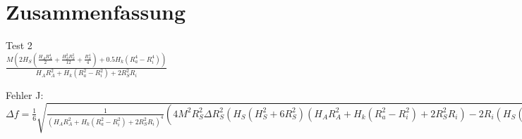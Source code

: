 
\section{Zusammenfassung}





Test 2\\

$\frac{M \left(2 H_{S} \left(\frac{H_{A} R_{A}^{4}}{2} + \frac{H_{S}^{2} R_{S}^{2}}{12} + \frac{R_{S}^{4}}{4}\right) + 0.5 H_{k} \left(R_{a}^{4} - R_{i}^{4}\right)\right)}{H_{A} R_{A}^{2} + H_{k} \left(R_{a}^{2} - R_{i}^{2}\right) + 2 R_{S}^{2} R_{i}}$\


Fehler J:
$\Delta f=\frac{1}{6} \sqrt{\frac{1}{\left(H_{A} R_{A}^{2} + H_{k} \left(R_{a}^{2} - R_{i}^{2}\right) + 2 R_{S}^{2} R_{i}\right)^{4}} \left(4 M^{2} R_{S}^{2} \Delta R_{S}^{2} \left(H_{S} \left(H_{S}^{2} + 6 R_{S}^{2}\right) \left(H_{A} R_{A}^{2} + H_{k} \left(R_{a}^{2} - R_{i}^{2}\right) + 2 R_{S}^{2} R_{i}\right) - 2 R_{i} \left(H_{S} \left(6 H_{A} R_{A}^{4} + H_{S}^{2} R_{S}^{2} + 3 R_{S}^{4}\right) + 3.0 H_{k} \left(R_{a}^{4} - R_{i}^{4}\right)\right)\right)^{2} + M^{2} \left(4 H_{A}^{2} R_{A}^{2} \Delta R_{A}^{2} \left(12 H_{S} R_{A}^{2} \left(H_{A} R_{A}^{2} + H_{k} \left(R_{a}^{2} - R_{i}^{2}\right) + 2 R_{S}^{2} R_{i}\right) - H_{S} \left(6 H_{A} R_{A}^{4} + H_{S}^{2} R_{S}^{2} + 3 R_{S}^{4}\right) - 3.0 H_{k} \left(R_{a}^{4} - R_{i}^{4}\right)\right)^{2} + 4 H_{k}^{2} R_{a}^{2} \Delta R_{a}^{2} \left(- H_{S} \left(6 H_{A} R_{A}^{4} + H_{S}^{2} R_{S}^{2} + 3 R_{S}^{4}\right) - 3.0 H_{k} \left(R_{a}^{4} - R_{i}^{4}\right) + 6.0 R_{a}^{2} \left(H_{A} R_{A}^{2} + H_{k} \left(R_{a}^{2} - R_{i}^{2}\right) + 2 R_{S}^{2} R_{i}\right)\right)^{2} + R_{A}^{4} \Delta H_{A}^{2} \left(6 H_{S} R_{A}^{2} \left(H_{A} R_{A}^{2} + H_{k} \left(R_{a}^{2} - R_{i}^{2}\right) + 2 R_{S}^{2} R_{i}\right) - H_{S} \left(6 H_{A} R_{A}^{4} + H_{S}^{2} R_{S}^{2} + 3 R_{S}^{4}\right) - 3.0 H_{k} \left(R_{a}^{4} - R_{i}^{4}\right)\right)^{2} + \Delta H_{k}^{2} \left(\left(R_{a}^{2} - R_{i}^{2}\right) \left(H_{S} \left(6 H_{A} R_{A}^{4} + H_{S}^{2} R_{S}^{2} + 3 R_{S}^{4}\right) + 3.0 H_{k} \left(R_{a}^{4} - R_{i}^{4}\right)\right) - 3.0 \left(R_{a}^{4} - R_{i}^{4}\right) \left(H_{A} R_{A}^{2} + H_{k} \left(R_{a}^{2} - R_{i}^{2}\right) + 2 R_{S}^{2} R_{i}\right)\right)^{2} + \Delta R_{i}^{2} \left(12.0 H_{k} R_{i}^{3} \left(H_{A} R_{A}^{2} + H_{k} \left(R_{a}^{2} - R_{i}^{2}\right) + 2 R_{S}^{2} R_{i}\right) - 2 \left(H_{S} \left(6 H_{A} R_{A}^{4} + H_{S}^{2} R_{S}^{2} + 3 R_{S}^{4}\right) + 3.0 H_{k} \left(R_{a}^{4} - R_{i}^{4}\right)\right) \left(H_{k} R_{i} - R_{S}^{2}\right)\right)^{2}\right) + \left(9 M^{2} \Delta H_{S}^{2} \left(2 H_{A} R_{A}^{4} + H_{S}^{2} R_{S}^{2} + R_{S}^{4}\right)^{2} + \Delta M^{2} \left(H_{S} \left(6 H_{A} R_{A}^{4} + H_{S}^{2} R_{S}^{2} + 3 R_{S}^{4}\right) + 3.0 H_{k} \left(R_{a}^{4} - R_{i}^{4}\right)\right)^{2}\right) \left(H_{A} R_{A}^{2} + H_{k} \left(R_{a}^{2} - R_{i}^{2}\right) + 2 R_{S}^{2} R_{i}\right)^{2}\right)}$